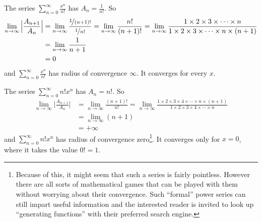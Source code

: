 \begin{eg}[Radius of convergence = $+\infty$]\label{eg:PWRb}
The series $\sum\limits_{n=0}^\infty \frac{x^n}{n!}$ has $A_n=\frac{1}{n!}$.
So
\begin{align*}
\lim_{n\rightarrow\infty}\Big|\frac{A_{n+1}}{A_n}\Big|
&=\lim_{n\rightarrow\infty}\frac{\nicefrac{1}{(n+1)!}}{\nicefrac{1}{n!}}
=\lim_{n\rightarrow\infty}\frac{n!}{(n+1)!}
=\lim_{n\rightarrow\infty}\frac{1\times 2\times 3\times\cdots\times n}
   {1\times 2\times 3\times\cdots\times n\times(n+1)} \\
&=\lim_{n\rightarrow\infty}\frac{1}{n+1} \\
&=0
\end{align*}
and $\sum\limits_{n=0}^\infty \frac{x^n}{n!}$ has radius of
convergence $\infty$. It converges for every $x$.
\end{eg}
\goodbreak

\begin{eg}[Radius of convergence = 0]\label{eg:PWRc}
The series $\sum\limits_{n=0}^\infty n! x^n$ has $A_n=n!$.
So
\begin{align*}
\lim_{n\rightarrow\infty}\Big|\frac{A_{n+1}}{A_n}\Big|
&=\lim_{n\rightarrow\infty}\frac{(n+1)!}{n!}
=\lim_{n\rightarrow\infty} \frac
   {1\times 2\times 3\times 4\times\cdots\times n\times(n+1)}
   {1\times 2\times 3\times 4\times\cdots\times n} \\
&=\lim_{n\rightarrow\infty}(n+1) \\
&=+\infty
\end{align*}
and $\sum\limits_{n=0}^\infty n! x^n$ has radius of convergence zero\footnote{Because of this, it might seem that
such a series is fairly pointless. However there are all sorts of
mathematical games that can be played with them without worrying
about their convergence. Such ``formal'' power series can still
impart useful information and the interested reader is invited
to look up ``generating functions'' with their preferred search engine.}.
It converges only for $x=0$, where it takes the value $0!=1$.
\end{eg}

